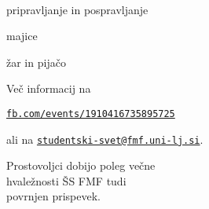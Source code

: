 \documentclass[a4paper,oneside,12pt]{article}
\title{\Title}
\author{\Author}
\date{\today}
\theoremstyle{definition}
\newenvironment{itemize*}{\vspace{-6pt}\begin{itemize}\setlength{\itemsep}{0pt}\setlength{\parskip}{2pt}}{\end{itemize}}
\begin{document}
\vspace*{-10ex}

\begin{center}
\fontsize{64}{64}\selectfont
{} \\[1ex]
\end{center}

\fontsize{48}{48}\selectfont
\vspace{-1ex}
\begin{itemize*}
  \item pripravljanje in pospravljanje
  \item majice
  \item žar in pijačo
\end{itemize*}

\vspace{-1ex}

\hspace{2em}

\vspace{-1.5ex}

\fontsize{24}{24}\selectfont
Več informacij na
\begin{center}
  \vspace{-3ex}
\href{https://www.facebook.com/events/1910416735895725/}{\texttt{fb.com/events/1910416735895725}}
  \vspace{-3ex}
\end{center}
ali na
\href{mailto:studentski-svet@fmf.uni-lj.si}{\tt studentski-svet@fmf.uni-lj.si}.

\vspace{-1.5ex}
\fontsize{48}{48}\selectfont
Prostovoljci dobijo poleg večne \\
hvaležnosti ŠS FMF tudi \\ povrnjen prispevek.
\end{document}
